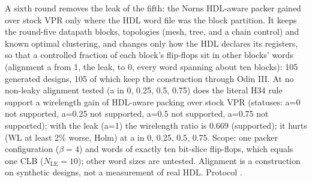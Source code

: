 
A sixth round removes the leak of the fifth: the Norns HDL-aware packer gained over stock VPR only where the HDL word file was the block partition. It keeps the round-five datapath blocks, topologies (mesh, tree, and a chain control) and known optimal clustering, and changes only how the HDL declares its registers, so that a controlled fraction of each block's flip-flops sit in other blocks' words (alignment a from 1, the leak, to 0, every word spanning about ten blocks): 105 generated designs, 105 of which keep the construction through Odin III. At no non-leaky alignment tested (a in {0, 0.25, 0.5, 0.75}) does the literal H34 rule support a wirelength gain of HDL-aware packing over stock VPR (statuses: a=0 not supported, a=0.25 not supported, a=0.5 not supported, a=0.75 not supported); with the leak (a=1) the wirelength ratio is 0.669 (supported); it hurts (WL at least 2\% worse, Holm) at a in {0, 0.25, 0.5, 0.75}. Scope: one packer configuration ($\beta=4$) and words of exactly ten bit-slice flip-flops, which equals one CLB ($N_{\mathrm{LE}}=10$); other word sizes are untested. Alignment is a construction on synthetic designs, not a measurement of real HDL. Protocol .
